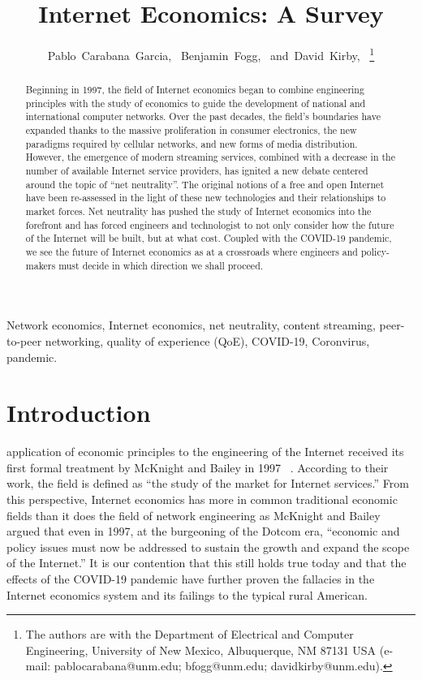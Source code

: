 \documentclass[journal]{IEEEtran}
\begin{document}
\title{Internet Economics: A Survey}%

\author{Pablo~Carabana~Garcia,~\IEEEmembership{}%
        Benjamin~Fogg,~\IEEEmembership{}%
        and~David~Kirby,~%
\thanks{The authors are with the Department of Electrical and Computer Engineering, University of New Mexico, Albuquerque, NM 87131 USA (e-mail: pablocarabana@unm.edu; bfogg@unm.edu; davidkirby@unm.edu).}%
}

\maketitle
\begin{abstract}
Beginning in 1997, the field of Internet economics began to combine engineering principles with the study of economics to guide the development of national and international computer networks. Over the past decades, the field's boundaries have expanded thanks to the massive proliferation in consumer electronics, the new paradigms required by cellular networks, and new forms of media distribution. However, the emergence of modern streaming services, combined with a decrease in the number of available Internet service providers, has ignited a new debate centered around the topic of \enquote{net neutrality}. The original notions of a free and open Internet have been re-assessed in the light of these new technologies and their relationships to market forces. Net neutrality has pushed the study of Internet economics into the forefront and has forced engineers and technologist to not only consider how the future of the Internet will be built, but at what cost. Coupled with the COVID-19 pandemic, we see the future of Internet economics as at a crossroads where engineers and policy-makers must decide in which direction we shall proceed.
\end{abstract}
\begin{IEEEkeywords}
Network economics, Internet economics, net neutrality, content streaming, peer-to-peer networking, quality of experience (QoE), COVID-19, Coronvirus, pandemic.
\end{IEEEkeywords}

\section{Introduction}
 application of economic principles to the engineering of the Internet received its first formal treatment by McKnight and Bailey in 1997~ \cite{mcknightbailey97}. According to their work, the field is defined as \enquote{the study of the market for Internet services.} From this perspective, Internet economics has more in common traditional economic fields than it does the field of network engineering as McKnight and Bailey argued that even in 1997, at the burgeoning of the Dotcom era, \enquote{economic and policy issues must now be addressed to sustain the growth and expand the scope of the Internet.} It is our contention that this still holds true today and that the effects of the COVID-19 pandemic have further proven the fallacies in the Internet economics system and its failings to the typical rural American.
\end{document}
